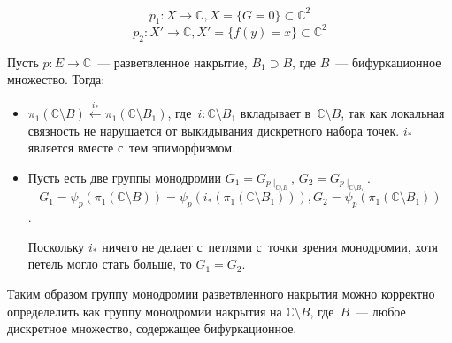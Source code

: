 \documentclass{article}
\begin{document}
\begin{example}
	$$p_1: X \rightarrow \mathbb{C}, X = \{G = 0\} \subset \mathbb{C}^2$$
	$$p_2: X' \rightarrow \mathbb{C}, X' = \{f(y) = x\} \subset \mathbb{C}^2$$
\end{example}

Пусть $p: E \rightarrow \mathbb{C}$~--- разветвленное накрытие, $B_1 \supset B$,
где $B$~--- бифуркационное множество. Тогда:
\begin{itemize}
	\item $\pi_1(\mathbb{C} \setminus B) \overset{i_\ast}\leftarrow
		\pi_1(\mathbb{C} \setminus B_1)$, где~$i: \mathbb{C} \setminus B_1$
		вкладывает в~$\mathbb{C} \setminus B$, так как локальная связность не
		нарушается от выкидывания дискретного набора точек. $i_\ast$ является вместе
		с~тем эпиморфизмом.
	\item Пусть есть две группы монодромии $G_1 = G_{p\mid_{\mathbb{C} \setminus
		B}}$, $G_2 = G_{p\mid_{\mathbb{C} \setminus B_1}}$. $$G_1 =
		\psi_p(\pi_1(\mathbb{C} \setminus B)) = \psi_p(i_\ast(\pi_1(\mathbb{C}
		\setminus B_1))), G_2 = \psi_p(\pi_1(\mathbb{C} \setminus B_1))$$.

		Поскольку $i_\ast$ ничего не делает с~петлями с~точки зрения монодромии,
		хотя петель могло стать больше, то $G_1 = G_2$.
\end{itemize}

Таким образом группу монодромии разветвленного накрытия можно корректно
определелить как группу монодромии накрытия на $\mathbb{C} \setminus B$,
где~$B$~--- любое дискретное множество, содержащее бифуркационное.
\end{document}
